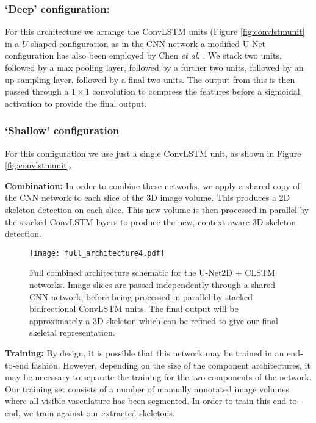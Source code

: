 \documentclass[journal,transmag]{IEEEtran}
\begin{document}
\subsubsection{`Deep' configuration:}
\label{sec:deep_clstm}
For this architecture we arrange the ConvLSTM units (Figure \ref{fig:convlstmunit} in a $U$-shaped configuration as in the CNN network a modified U-Net configuration has also been employed by Chen \emph{et al.} \cite{Chen2016}. We stack two units, followed by a max pooling layer, followed by a further two units, followed by an up-sampling layer, followed by a final two units. The output from this is then passed through a $1\times1$ convolution to compress the features before a sigmoidal activation to provide the final output.
\subsubsection{`Shallow' configuration}
\label{sec:shallow_clstm}
For this configuration we use just a single ConvLSTM unit, as shown in Figure \ref{fig:convlstmunit}.

\textbf{Combination: } In order to combine these networks, we apply a shared copy of the CNN network to each slice of the 3D image volume. This produces a 2D skeleton detection on each slice. This new volume is then processed in parallel by the stacked ConvLSTM layers to produce the new, context aware 3D skeleton detection.

\begin{figure*}
\centering
\texttt{[image: full\_architecture4.pdf]}
\caption{Full combined architecture schematic for the U-Net2D + CLSTM networks. Image slices are passed independently through a shared CNN network, before being processed in parallel by stacked bidirectional ConvLSTM units. The final output will be approximately a 3D skeleton which can be refined to give our final skeletal representation. }
\label{fig:full_architecture}
\end{figure*}

\textbf{Training: } By design, it is possible that this network may be trained in an end-to-end fashion. However, depending on the size of the component architectures, it may be necessary to  separate the training for the two components of the network. Our training set consists of a number of manually annotated image volumes where all visible vasculature has been segmented. In order to train this end-to-end, we train against our extracted skeletons.
\end{document}
